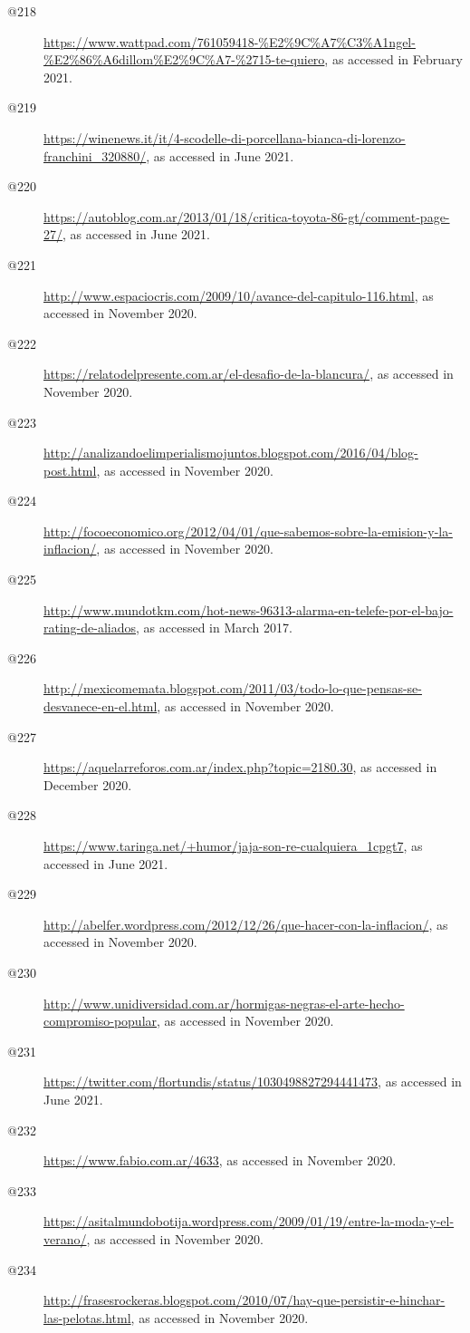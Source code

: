 \begin{flushleft}
\begin{description}
\item[@218]\url{https://www.wattpad.com/761059418-\%E2\%9C\%A7\%C3\%A1ngel-\%E2\%86\%A6dillom\%E2\%9C\%A7-\%2715-te-quiero}, as accessed in February 2021.
\item[@219]\url{https://winenews.it/it/4-scodelle-di-porcellana-bianca-di-lorenzo-franchini_320880/}, as accessed in June 2021.
\item[@220]\url{https://autoblog.com.ar/2013/01/18/critica-toyota-86-gt/comment-page-27/}, as accessed in June 2021.
\item[@221]\url{http://www.espaciocris.com/2009/10/avance-del-capitulo-116.html}, as accessed in November 2020.
\item[@222]\url{https://relatodelpresente.com.ar/el-desafio-de-la-blancura/}, as accessed in November 2020.
\item[@223]\url{http://analizandoelimperialismojuntos.blogspot.com/2016/04/blog-post.html}, as accessed in November 2020.
\item[@224]\url{http://focoeconomico.org/2012/04/01/que-sabemos-sobre-la-emision-y-la-inflacion/}, as accessed in November 2020.
\item[@225]\url{http://www.mundotkm.com/hot-news-96313-alarma-en-telefe-por-el-bajo-rating-de-aliados}, as accessed in March 2017.
\item[@226]\url{http://mexicomemata.blogspot.com/2011/03/todo-lo-que-pensas-se-desvanece-en-el.html}, as accessed in November 2020.
\item[@227]\url{https://aquelarreforos.com.ar/index.php?topic=2180.30}, as accessed in December 2020.
\item[@228]\url{https://www.taringa.net/+humor/jaja-son-re-cualquiera_1cpgt7}, as accessed in June 2021.
\item[@229]\url{http://abelfer.wordpress.com/2012/12/26/que-hacer-con-la-inflacion/}, as accessed in November 2020.
\item[@230]\url{http://www.unidiversidad.com.ar/hormigas-negras-el-arte-hecho-compromiso-popular}, as accessed in November 2020.
\item[@231]\url{https://twitter.com/flortundis/status/1030498827294441473}, as accessed in June 2021.
\item[@232]\url{https://www.fabio.com.ar/4633}, as accessed in November 2020.
\item[@233]\url{https://asitalmundobotija.wordpress.com/2009/01/19/entre-la-moda-y-el-verano/}, as accessed in November 2020.
\item[@234]\url{http://frasesrockeras.blogspot.com/2010/07/hay-que-persistir-e-hinchar-las-pelotas.html}, as accessed in November 2020.

\end{description}
\end{flushleft}
